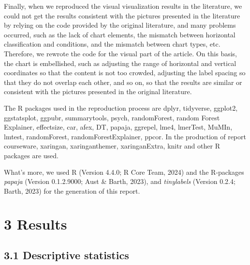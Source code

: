 \documentclass[
  man,floatsintext]{apa6}
\begin{document}
Finally, when we reproduced the visual visualization results in the literature, we could not get the results consistent with the pictures presented in the literature by relying on the code provided by the original literature, and many problems occurred, such as the lack of chart elements, the mismatch between horizontal classification and conditions, and the mismatch between chart types, etc. Therefore, we rewrote the code for the visual part of the article. On this basis, the chart is embellished, such as adjusting the range of horizontal and vertical coordinates so that the content is not too crowded, adjusting the label spacing so that they do not overlap each other, and so on, so that the results are similar or consistent with the pictures presented in the original literature.

The R packages used in the reproduction process are dplyr, tidyverse, ggplot2, ggstatsplot, ggpubr, summarytools, psych, randomForest, random Forest Explainer, effectsize, car, afex, DT, papaja, ggrepel, lme4, lmerTest, MuMIn, lmtest, randomForest, randomForestExplainer, ppcor. In the production of report courseware, xaringan, xaringanthemer, xaringanExtra, knitr and other R packages are used.

What's more, we used R (Version 4.4.0; R Core Team, 2024) and the R-packages \emph{papaja} (Version 0.1.2.9000; Aust \& Barth, 2023), and \emph{tinylabels} (Version 0.2.4; Barth, 2023) for the generation of this report.

\section{3 Results}\label{results}

\subsection{3.1 Descriptive statistics}\label{descriptive-statistics}
\end{document}

